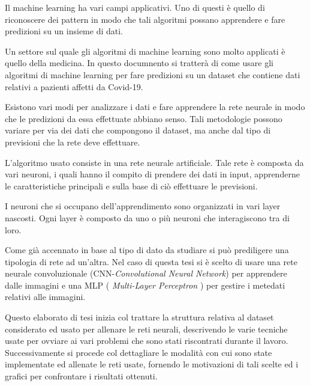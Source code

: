 Il machine learning ha vari campi applicativi.
Uno di questi è quello di riconoscere dei pattern in modo che tali algoritmi possano apprendere e fare predizioni su un insieme di dati.

Un settore sul quale gli algoritmi di machine learning sono molto applicati è quello della medicina.
In questo documnento si tratterà di come usare gli algoritmi di machine learning per fare predizioni su un dataset che contiene dati relativi a pazienti affetti da Covid-19.

Esistono vari modi per analizzare i dati e fare apprendere la rete neurale in modo che le predizioni da essa effettuate abbiano senso.
Tali metodologie possono variare per via dei dati che compongono il dataset, ma anche dal tipo di previsioni che la rete deve effettuare.

L'algoritmo usato consiste in una rete neurale artificiale.
Tale rete è composta da vari neuroni, i quali hanno il compito di prendere dei dati in input, apprenderne le caratteristiche principali e sulla base di ciò effettuare le previsioni.

I neuroni che si occupano dell'apprendimento sono organizzati in vari layer nascosti. Ogni layer è composto da uno o più neuroni che interagiscono tra di loro. 

Come già accennato in base al tipo di dato da studiare si può prediligere una tipologia di rete ad un'altra.
Nel caso di questa tesi si è scelto di usare una rete neurale convoluzionale (CNN-\emph{Convolutional Neural Network}) per apprendere dalle immagini e una MLP ( \emph{Multi-Layer Perceptron} ) per gestire i metedati relativi alle immagini.



Questo elaborato di tesi inizia col trattare la struttura relativa al dataset considerato ed usato per allenare le 
reti neurali, descrivendo le varie tecniche usate per ovviare ai vari problemi che sono stati riscontrati durante il lavoro.
Successivamente si procede col dettagliare le modalità con cui sono state implementate ed allenate le reti usate, fornendo le motivazioni
di tali scelte ed i grafici per confrontare i risultati ottenuti. 